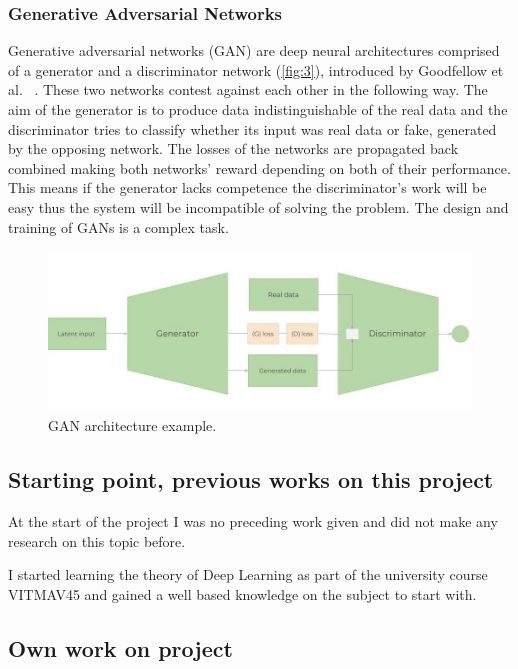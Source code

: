 \documentclass[11pt,a4paper,oneside]{article}
\begin{document}
  \subsubsection{Generative Adversarial Networks}
  \label{sec:gans}

  Generative adversarial networks (GAN) are deep neural architectures comprised of a generator and a discriminator 
  network (\autoref{fig:3}), introduced by Goodfellow et al. ~\cite{gan}. These two networks contest against each other 
  in the following way. The aim of the generator is to produce data indistinguishable of the real data and the 
  discriminator tries to classify whether its input was real data or fake, generated by the opposing network. The losses 
  of the networks are propagated back combined making both networks’ reward depending on both of their performance. This 
  means if the generator lacks competence the discriminator’s work will be easy thus the system will be incompatible of 
  solving the problem. The design and training of GANs is a complex task.

  \begin{figure}[tbh]
    \centering
    \includegraphics[width=12cm]{gan.jpg}
    \caption{GAN architecture example.}
    \label{fig:3}
  \end{figure}

\subsection{Starting point, previous works on this project}
\label{sec:prev_works}

At the start of the project I was no preceding work given and did not make any research on this topic before.

I started learning the theory of Deep Learning as part of the university course VITMAV45 and gained a well based 
knowledge on the subject to start with.

\newpage
\begin{center}
  \section{Own work on project}
  \label{sec:work}
\end{center}
\end{document}
